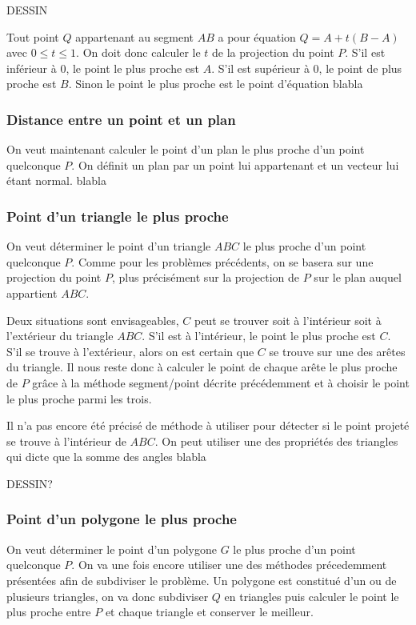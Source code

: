 \documentclass[twocolumn]{article}
\begin{document}
DESSIN

Tout point $Q$ appartenant au segment $AB$ a pour équation $Q=A+t(B-A)$ avec $0 \leq t \leq 1$. On doit donc calculer le $t$ de la projection du point $P$. S'il est inférieur à $0$, le point le plus proche est $A$. S'il est supérieur à $0$, le point de plus proche est $B$. Sinon le point le plus proche est le point d'équation blabla

\subsubsection{Distance entre un point et un plan}

On veut maintenant calculer le point d'un plan le plus proche d'un point quelconque $P$. On définit un plan par un point lui appartenant et un vecteur lui étant normal. blabla

\subsubsection{Point d'un triangle le plus proche}

On veut déterminer le point d'un triangle $ABC$ le plus proche d'un point quelconque $P$. Comme pour les problèmes précédents, on se basera sur une projection du point $P$, plus précisément sur la projection de $P$ sur le plan auquel appartient $ABC$.

Deux situations sont envisageables, $C$ peut se trouver soit à l'intérieur soit à l'extérieur du triangle $ABC$. S'il est à l'intérieur, le point le plus proche est $C$. S'il se trouve à l'extérieur, alors on est certain que $C$ se trouve sur une des arêtes du triangle. Il nous reste donc à calculer le point de chaque arête le plus proche de $P$ grâce à la méthode segment/point décrite précédemment et à choisir le point le plus proche parmi les trois.

Il n'a pas encore été précisé de méthode à utiliser pour détecter si le point projeté se trouve à l'intérieur de $ABC$. On peut utiliser une des propriétés des triangles qui dicte que la somme des angles blabla

DESSIN?

\subsubsection{Point d'un polygone le plus proche}

On veut déterminer le point d'un polygone $G$ le plus proche d'un point quelconque $P$. On va une fois encore utiliser une des méthodes précedemment présentées afin de subdiviser le problème. Un polygone est constitué d'un ou de plusieurs triangles, on va donc subdiviser $Q$ en triangles puis calculer le point le plus proche entre $P$ et chaque triangle et conserver le meilleur.
\end{document}
